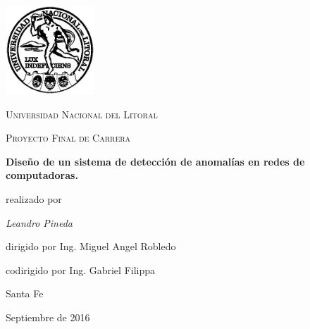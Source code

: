 \documentclass[a4paper,10pt, oneside]{book}
\begin{document}
\begin{titlepage}
	\centering
	\includegraphics[width=0.25\textwidth]{Universidad_del_Litoral}\par\vspace{1cm}
	{\scshape\LARGE Universidad Nacional del Litoral \par}	
	{\scshape\Large Proyecto Final de Carrera\par}
	\vspace{1.5cm}
	{\huge\bfseries Diseño de un sistema de detección de anomalías en redes de computadoras.\par}
	\vspace{6cm}
	realizado por \par
	{\Large\itshape Leandro Pineda\par}
	\vspace{1cm}
	dirigido por Ing. Miguel Angel Robledo\par
	codirigido por Ing. Gabriel Filippa
	

	\vfill
	
	
	
	\large Santa Fe\par
	{Septiembre de 2016 \par}
	
\end{titlepage}

\modulolinenumbers[5]





\newpage
 
\nocite{*}
\printbibliography
\end{document}
